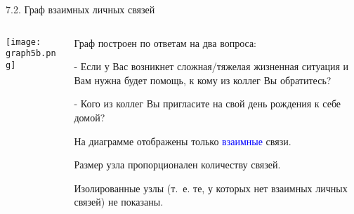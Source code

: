 \begin{frame}{7.2. Граф взаимных личных связей}

\begin{columns}
\begin{column}{0.75\textwidth} 
\centering
          \texttt{[image: graph5b.png]}
\end{column}
\begin{column}{0.25\textwidth} 
\tiny
Граф построен по ответам на два вопроса:
\smallskip

- Если у Вас возникнет сложная/тяжелая жизненная ситуация и Вам нужна будет помощь, к кому из коллег Вы обратитесь?
\smallskip

- Кого из коллег Вы пригласите на свой день рождения к себе домой?
\smallskip

На диаграмме отображены только \textcolor{blue}{взаимные} связи.
\smallskip

Размер узла пропорционален количеству связей.
\smallskip

Изолированные узлы (т.~е. те, у которых нет взаимных личных связей) не показаны.

\end{column}
\end{columns}
\end{frame}


